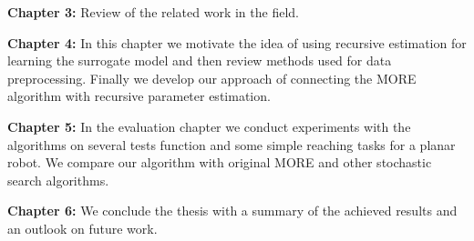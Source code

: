 \textbf{Chapter 3:} Review of the related work in the field.

\textbf{Chapter 4:} In this chapter we motivate the idea of
using recursive estimation for learning the surrogate model
and then review methods used for data preprocessing.
Finally we develop our approach of  connecting
the MORE algorithm with recursive parameter estimation. 

\textbf{Chapter 5:} In the evaluation chapter we conduct experiments
with the algorithms on several tests function and some simple reaching tasks
for a planar robot. We compare our algorithm with original MORE and
other stochastic search algorithms.

\textbf{Chapter 6:} We conclude the thesis with a summary of
the achieved results and an outlook on future work.